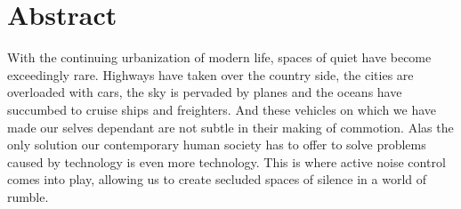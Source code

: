 \chapter{\centering Abstract}

With the continuing urbanization of modern life, spaces of quiet have become exceedingly rare. Highways have taken over the country side, the cities are overloaded with cars, the sky is pervaded by planes and the oceans have succumbed to cruise ships and freighters. And these vehicles on which we have made our selves dependant are not subtle in their making of commotion.
Alas the only solution our contemporary human society has to offer to solve problems caused by technology is even more technology. This is where active noise control comes into play, allowing us to create secluded spaces of silence in a world of rumble.